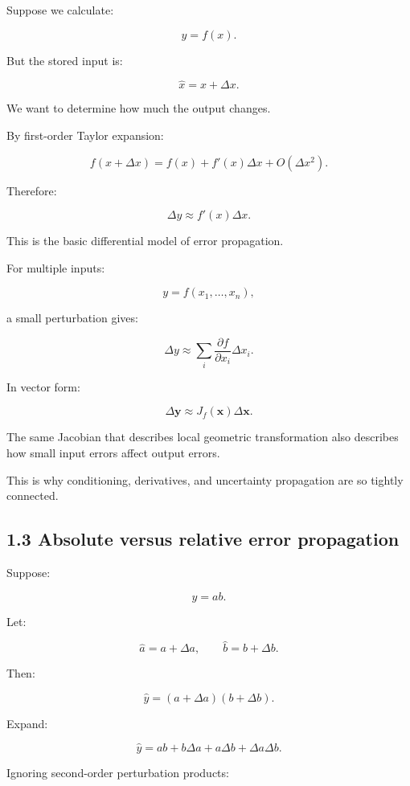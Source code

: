 Suppose we calculate:

\[ y=f(x). \]

But the stored input is:

\[ \hat x=x+\Delta x. \]

We want to determine how much the output changes.

By first-order Taylor expansion:

\[ f(x+\Delta x) = f(x)+f'(x)\Delta x+ O(\Delta x^2). \]

Therefore:

\[ \boxed{ \Delta y\approx f'(x)\Delta x }. \]

This is the basic differential model of error propagation.

For multiple inputs:

\[ y=f(x_1,\ldots,x_n), \]

a small perturbation gives:

\[ \boxed{ \Delta y\approx \sum_i \frac{\partial f}{\partial x_i} \Delta x_i }. \]

In vector form:

\[ \boxed{ \Delta\mathbf y\approx J_f(\mathbf x)\Delta\mathbf x }. \]

The same Jacobian that describes local geometric transformation also describes how small input errors affect output errors.

This is why conditioning, derivatives, and uncertainty propagation are so tightly connected.

\subsection{1.3 Absolute versus relative error propagation}\label{02-foundations-ii-ch028-absolute-versus-relative-error-propagation}

\hypertarget{02-foundations-ii-ch028-absolute-versus-relative-error-propagation}{}

Suppose:

\[ y=ab. \]

Let:

\[ \hat a=a+\Delta a,\qquad \hat b=b+\Delta b. \]

Then:

\[ \hat y=(a+\Delta a)(b+\Delta b). \]

Expand:

\[ \hat y = ab+b\Delta a+a\Delta b+\Delta a\Delta b. \]

Ignoring second-order perturbation products:


